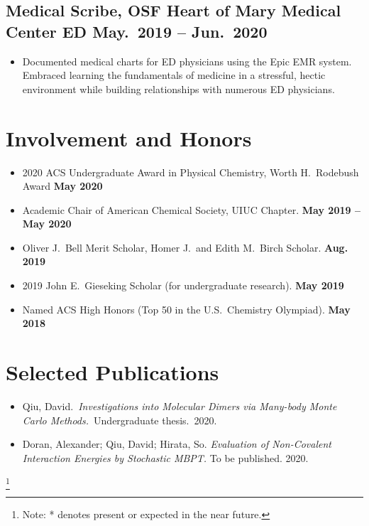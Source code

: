 \documentclass{article}
\begin{document}
\subsection{Medical Scribe, OSF Heart of Mary Medical Center ED \hfill May.\ 2019 -- Jun.\ 2020}
\begin{itemize}[noitemsep, nolistsep]
	\item Documented medical charts for ED physicians using the Epic EMR
		system. Embraced learning the fundamentals of medicine in a
		stressful, hectic environment while building relationships with
		numerous ED physicians.
\end{itemize}

\section{Involvement and Honors}
\begin{itemize}[noitemsep,nolistsep]
	\item 2020 ACS Undergraduate Award in Physical Chemistry, Worth H.\ Rodebush Award
	\hfill\textbf{May 2020}

	\item Academic Chair of American Chemical Society, UIUC Chapter.
	\hfill\textbf{May 2019 -- May 2020}

	\item Oliver J.\ Bell Merit Scholar, Homer J.\ and Edith M.\ Birch
	Scholar.
	\hfill\textbf{Aug. 2019}

	\item 2019 John E.\ Gieseking Scholar (for undergraduate research).
	\hfill\textbf{May 2019}

	\item Named ACS High Honors (Top 50 in the U.S.\ Chemistry Olympiad).
	\hfill\textbf{May 2018}
\end{itemize}

\section{Selected Publications}

\begin{itemize}[noitemsep, nolistsep]
	\item Qiu, David.\ \emph{Investigations into Molecular Dimers via
		Many-body Monte Carlo Methods.}\ Undergraduate thesis.\ 2020.

	\item Doran, Alexander; Qiu, David; Hirata, So. \emph{Evaluation of
		Non-Covalent Interaction Energies by Stochastic MBPT.} To be
		published. 2020.
\end{itemize}

\newcommand\blfootnote[1]{%
	\begingroup
	\renewcommand\thefootnote{}\footnote{#1}%
	\addtocounter{footnote}{-1}%
	\endgroup
}

\blfootnote{Note: * denotes present or expected in the near future.}
\end{document}
